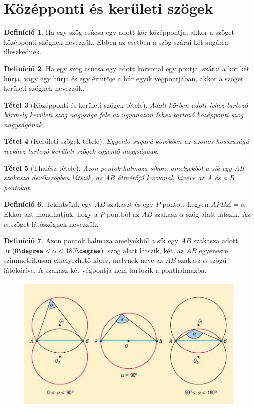 \documentclass[twoside,12pt]{report}
\newtheorem{theorem}{Tétel}[section]
\theoremstyle{definition}
\newtheorem{definition}[theorem]{Definíció}
\begin{document}
\section{Középponti és kerületi szögek}
	\begin{definition}
		Ha egy szög csúcsa egy adott kör középpontja, akkor a szöget középponti szögnek nevezzük. Ebben az esetben a szög szárai két sugárra illeszkednek.
	\end{definition}
	\begin{definition}
		Ha egy szög csúcsa egy adott körvonal egy pontja, szárai a kör két húrja, vagy egy húrja és egy érintője a húr egyik végpontjában, akkor a szöget kerületi szögnek nevezzük.
	\end{definition}
	\begin{theorem}[Középponti és kerületi szögek tétele]
		Adott körben adott ívhez tartozó bármely kerületi szög nagysága fele az ugyanazon ívhez tartozó középponti szög nagyságának.
	\end{theorem}
	\begin{theorem}[Kerületi szögek tétele]
		Egyenlő sugarú körökben az azonos hosszúságú ívekhez tartozó kerületi szögek egyenlő nagyságúak.
	\end{theorem}
	\begin{theorem}[Thalész-tétele]
		Azon pontok halmaza síkon, amelyekből a sík egy AB szakasza derékszögben látszik, az AB átmérőjű körvonal, kivéve az A és a B pontokat.
	\end{theorem}
	\begin{definition}
		Tekintsünk egy $AB$ szakaszt és egy $P$ pontot. Legyen $APB\angle=\alpha$. Ekkor azt mondhatjuk, hogy a $P$ pontból az $AB$ szakasz $\alpha$ szög alatt látszik. Az $\alpha$ szöget látószögnek nevezzük.
	\end{definition}
	\begin{definition}
		Azon pontok halmaza amelyekből a sík egy $AB$ szakasza adott $\alpha\  (0\degree<\alpha<180\degree)$ szög alatt látszik, két, az $AB$ egyenesre szimmetrikusan elhelyezhető körív, melynek neve az $AB$ szakasz $\alpha$ szögű látóköríve. A szakasz két végpontja nem tartozik a ponthalmazba.
	\end{definition}
	\begin{figure}[H]
		\centering
		\includegraphics[width=0.7\linewidth]{Lato}
	\end{figure}
\end{document}

